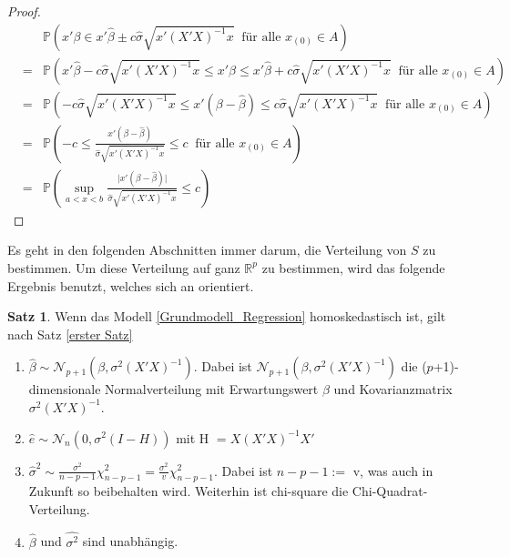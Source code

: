 \documentclass[12pt,a4paper]{article}
\theoremstyle{definition}
\theoremstyle{definition}
\newtheorem{Satz}[Definition]{Satz}
\theoremstyle{definition}
\theoremstyle{definition}
\begin{document}
\begin{proof}
\begin{eqnarray*}
&& \mathbb{P}( x'\beta \in x' \hat{\beta} \pm c \hat{\sigma} \sqrt{x' (X'X)^{-1}x} ~ \text{ für alle } x_{(0)} \in A ) \\
&=& \mathbb{P}( x' \hat{\beta} - c \hat{\sigma} \sqrt{x' (X'X)^{-1}x} \leq x'\beta \leq x' \hat{\beta} + c \hat{\sigma} \sqrt{x' (X'X)^{-1}x} ~ \text{ für alle } x_{(0)} \in A ) \\
&=& \mathbb{P}( - c \hat{\sigma} \sqrt{x' (X'X)^{-1}x} \leq x' (\beta - \hat{\beta}) \leq  c \hat{\sigma} \sqrt{x' (X'X)^{-1}x} ~ \text{ für alle } x_{(0)} \in A ) \\
&=& \mathbb{P}( - c  \leq \frac{x' (\beta - \hat{\beta})}{\hat{\sigma} \sqrt{x' (X'X)^{-1}x}}  \leq  c ~ \text{ für alle } x_{(0)} \in A ) \\
&=& \mathbb{P}( \sup_{a<x<b}  \frac{\vert x'(\beta - \hat{\beta}) \vert}{\hat{\sigma} \sqrt{x'(X'X)^{-1}x}}  \leq c)
\end{eqnarray*}
\end{proof}

Es geht in den folgenden Abschnitten immer darum, die Verteilung von $S$ zu bestimmen. Um diese Verteilung auf ganz $\mathbb{R}^p$ zu bestimmen, wird das folgende Ergebnis benutzt, welches sich an \cite[6]{Liu64} orientiert. 

\begin{Satz} \label{Basiseigenschaften}
Wenn das Modell \eqref{Grundmodell_Regression} homoskedastisch ist, gilt nach Satz \ref{erster Satz} 

\begin{enumerate}
\item $\hat{\beta} \sim \mathscr{N}_{p+1}(\beta,\sigma^2(X'X)^{-1})$. Dabei ist $\mathscr{N}_{p+1}(\beta,\sigma^2(X'X)^{-1})$ die ($p$+1)-dimensionale Normalverteilung mit Erwartungswert $\beta$ und Kovarianzmatrix $\sigma^2 (X'X)^{-1}$.
\item $\hat{e} \sim \mathscr{N}_{n}(0,\sigma^2(I-H)) $ mit  \gls{H} $=X(X'X)^{-1}X' $
\item $\hat{\sigma}^2 \sim \frac{\sigma^2}{n-p-1}\chi_{n-p-1}^2 = \frac{\sigma^2}{v}\chi^2_{n-p-1}$. Dabei ist $n-p-1 :=$ \gls{v}, was auch in Zukunft so beibehalten wird. Weiterhin ist \gls{chi-square} die Chi-Quadrat-Verteilung.
\item $\hat{\beta}$ und $\widehat{\sigma^2}$ sind unabhängig.
\end{enumerate}
\end{Satz}
\end{document}
